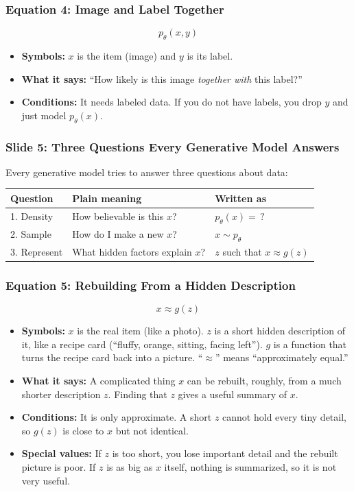 \subsubsection*{Equation 4: Image and Label Together}

\[
p_\theta(x, y)
\]

\begin{itemize}
  \item \textbf{Symbols:} $x$ is the item (image) and $y$ is its label.
  \item \textbf{What it says:} ``How likely is this image \textit{together with} this label?''
  \item \textbf{Conditions:} It needs labeled data. If you do not have labels, you drop $y$ and just model $p_\theta(x)$.
\end{itemize}

\subsubsection*{Slide 5: Three Questions Every Generative Model Answers}

Every generative model tries to answer three questions about data:

\begin{tabular}{@{}p{2.5cm}p{6cm}p{4cm}@{}}
\toprule
\textbf{Question} & \textbf{Plain meaning} & \textbf{Written as} \\
\midrule
1. Density & How believable is this $x$? & $p_\theta(x) = \,?$ \\
2. Sample & How do I make a new $x$? & $x \sim p_\theta$ \\
3. Represent & What hidden factors explain $x$? & $z$ such that $x \approx g(z)$ \\
\bottomrule
\end{tabular}

\subsubsection*{Equation 5: Rebuilding From a Hidden Description}

\[
x \approx g(z)
\]

\begin{itemize}
  \item \textbf{Symbols:} $x$ is the real item (like a photo). $z$ is a short hidden description of it, like a recipe card (``fluffy, orange, sitting, facing left''). $g$ is a function that turns the recipe card back into a picture. ``$\approx$'' means ``approximately equal.''
  \item \textbf{What it says:} A complicated thing $x$ can be rebuilt, roughly, from a much shorter description $z$. Finding that $z$ gives a useful summary of $x$.
  \item \textbf{Conditions:} It is only approximate. A short $z$ cannot hold every tiny detail, so $g(z)$ is close to $x$ but not identical.
  \item \textbf{Special values:} If $z$ is too short, you lose important detail and the rebuilt picture is poor. If $z$ is as big as $x$ itself, nothing is summarized, so it is not very useful.
\end{itemize}


